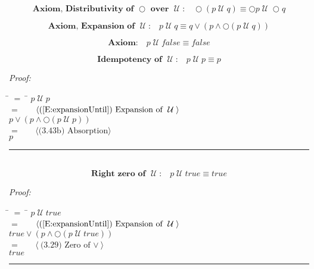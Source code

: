 \documentclass[fleqn, leqno]{article}
\newcommand{\lgap}{2pt}                             %
\newcommand{\mymathindent}{24pt}                    %
\newcommand{\Until}{\;\mathcal{U}\;}
\newcommand{\Next}{\bigcirc}
\newcommand{\myqed}{\hfill\rule[-.23ex]{1.2ex}{2.0ex}}
\newcommand{\Gll} {\langle}                         %
\newcommand{\Ggg} {\rangle}                         %
\newcommand{\Hint}[1]     {\ \ \ $\Gll              \mbox{#1} \Ggg$ }   %
\begin{document}
\begin{equation}\label{E:distNextUntil}
\textbf{Axiom, Distributivity of $\Next$ over $\Until$:}\quad \Next (p \Until q) \equiv \Next p \Until \Next q
\end{equation}

\begin{equation}\label{E:expansionUntil}
\textbf{Axiom, Expansion of $\Until$:}\quad p \Until q \equiv q \lor (p \land \Next (p \Until q))
\end{equation}


\begin{equation}\label{E:untilFalse}
\textbf{Axiom:}\quad p \Until false \equiv false
\end{equation}


\begin{equation}\label{E:idemUntil}
\textbf{Idempotency of $\Until$:}\quad p \Until p \equiv p
\end{equation}

\emph{Proof:}
\begin{tabbing}
\hspace{\mymathindent} \= $= \;$ \= \kill
  \> \>   $p \Until p$\\[\lgap]
  \> $=$  \>  \Hint{(\ref{E:expansionUntil}) Expansion of $\Until$}\\[\lgap]
  \> \>   $p \lor (p \land \Next(p \Until p))$\\[\lgap]
  \> $=$  \>  \Hint{(3.43b) Absorption}\\[\lgap]
  \> \>   $p$\\[\lgap]
\end{tabbing}
\myqed\\[\lgap]

\begin{equation}\label{E:zeroUntil}
\textbf{Right zero of $\Until$:}\quad p \Until true \equiv true
\end{equation}

\emph{Proof:}
\begin{tabbing}
\hspace{\mymathindent} \= $= \;$ \= \kill
  \> \>   $p \Until true$\\[\lgap]
  \> $=$  \>  \Hint{(\ref{E:expansionUntil}) Expansion of $\Until$}\\[\lgap]
  \> \>   $true \lor (p \land \Next(p \Until true))$\\[\lgap]
  \> $=$  \>  \Hint{(3.29) Zero of $\lor$}\\[\lgap]
  \> \>   $true$\\[\lgap]
\end{tabbing}
\myqed\\[\lgap]
\end{document}
